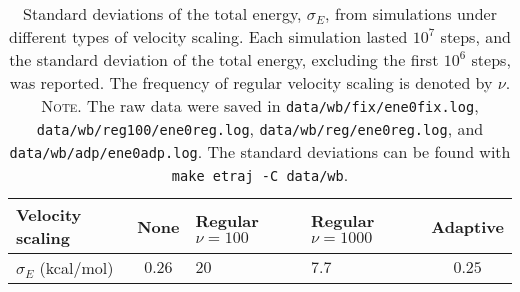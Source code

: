 \documentclass[reprint]{revtex4-1}
\newcommand{\note}[1]{{\color{DarkGreen}\footnotesize \textsc{Note.} #1}}
\begin{document}
\begin{table}[h]
  \setlength{\tabcolsep}{5pt}
  \renewcommand{\arraystretch}{1.5}
  \begin{center}
    \begin{tabular}{ p{2.5cm} | c p{1.3cm} p{1.3cm} c }
      \hline
      Velocity scaling
      &   None    &   Regular \newline $\nu =100 $   & Regular \newline $\nu = 1000$  &   Adaptive \\
      \hline
      $\sigma_E$ (kcal/mol)
      &   $0.26$  &   $20$    &  $7.7$     &   $0.25$ \\
      \hline
    \end{tabular}
  \end{center}
  \caption{
    \label{tab:etraj}
    Standard deviations of the total energy, $\sigma_E$,
    from simulations under different types of velocity scaling.
    Each simulation lasted $10^7$ steps,
    and the standard deviation of the total energy,
    excluding the first $10^6$ steps, was reported.
    The frequency of regular velocity scaling
    is denoted by $\nu$.
    \note{
      The raw data were saved in
      \texttt{data/wb/fix/ene0fix.log},
      \texttt{data/wb/reg100/ene0reg.log},
      \texttt{data/wb/reg/ene0reg.log},
      and
      \texttt{data/wb/adp/ene0adp.log}.
      The standard deviations can be found with
      \texttt{make etraj -C data/wb}.
    }%
  }
\end{table}

\end{document}

